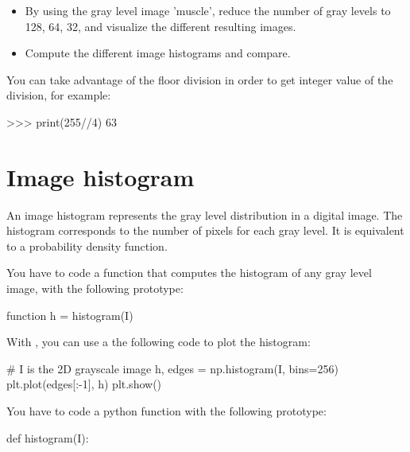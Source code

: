 \begin{qbox}
\begin{itemize}
\item By using the gray level image 'muscle', reduce the number of gray levels to  128, 64, 32, and visualize the different resulting images.
\item Compute the different image histograms and compare. 
\end{itemize}
\end{qbox}


\begin{pcomment}
 You can take advantage of the floor division in order to get integer value of the division, for example:
 \begin{sh}
>>> print(255//4)
63
 \end{sh}
 
\end{pcomment}



\vspace*{-8pt}
\section{Image histogram}
An image histogram represents the gray level distribution in a digital image.
The histogram corresponds to the number of pixels for each gray level. It is equivalent to a probability density function.

\begin{mcomment}
You have to code a \matlabregistered{} function that computes the histogram of any gray level image, with the following prototype:
\begin{matlab}
function h = histogram(I)
\end{matlab}
\end{mcomment}

\begin{pcomment}


With , you can use a the following code to plot the histogram:

\begin{python}
# I is the 2D grayscale image
h, edges = np.histogram(I, bins=256)
plt.plot(edges[:-1], h)
plt.show()
\end{python}

You have to code a python function with the following prototype:
\begin{python}
def histogram(I):
\end{python}

\end{pcomment}


